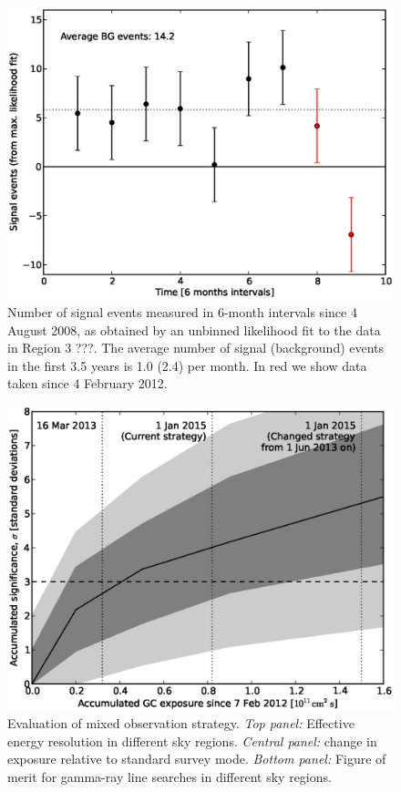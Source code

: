 \documentclass[aps,prd,superscriptaddress,showpacs]{revtex4}
\begin{document}
\begin{figure}[h]
  \begin{center}
    \includegraphics[width=0.66\linewidth]{plots/semester_fluxes.eps}
    \vspace{-0.5cm}
  \end{center}
  \caption{Number of signal events measured in 6-month intervals since 4
    August 2008, as obtained by an unbinned likelihood fit to the data in
    Region 3 ???. The average number of signal (background) events in the first
    3.5 years is 1.0 (2.4) per month. In red we show data taken since 4
    February 2012.}
  \label{fig:semester_fluxes}
\end{figure}


\begin{figure}[h]
  \begin{center}
    \includegraphics[width=0.8\linewidth]{plots/projection.eps}
    \vspace{-0.5cm}
  \end{center}
  \caption{Evaluation of mixed observation strategy. \emph{Top panel:}
    Effective energy resolution in different sky regions. \emph{Central
      panel:} change in exposure relative to standard survey
    mode. \emph{Bottom panel:} Figure of merit for gamma-ray line searches in
    different sky regions.}
  \label{fig:option}
\end{figure}
\end{document}
